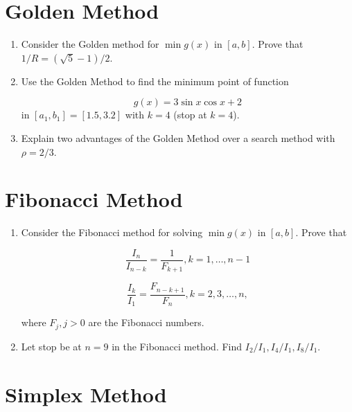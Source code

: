 \documentclass[11pt,oneside]{extarticle}
\begin{document}
\section{Golden Method}

\begin{enumerate}
    
    \item Consider the Golden method for $\min g(x)$ in $[a,b]$. Prove that
        $1/R = (\sqrt{5} - 1) / 2$.

    \item Use the Golden Method to find the minimum point of function

        $$g(x) = 3\sin x\cos x + 2$$
        in $[a_1,b_1]=[1.5,3.2]$ with $k=4$ (stop at $k=4$).

    \item Explain two advantages of the Golden Method over a search method
        with $\rho=2/3$.

\end{enumerate}

\section{Fibonacci Method}

\begin{enumerate}

    \item Consider the Fibonacci method for solving $\min g(x)$ in $[a,b]$.
        Prove that

        $$\frac{I_n}{I_{n-k}}=\frac{1}{F_{k+1}}, k=1,\ldots,n-1$$

        $$\frac{I_k}{I_1}=\frac{F_{n-k+1}}{F_n}, k=2,3,\ldots,n,$$

        where $F_j,j>0$ are the Fibonacci numbers.

    \item Let stop be at $n=9$ in the Fibonacci method. Find $I_2/I_1,I_4/I_1,
        I_8/I_1$.

\end{enumerate}

\section{Simplex Method}
\end{document}
